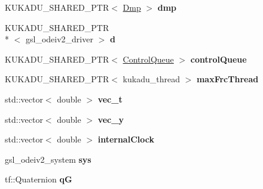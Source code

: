 \begin{DoxyCompactItemize}
\item 
\hypertarget{classkukadu_1_1DMPExecutor_a86ae6f53f67b0bc48e3973f587bd1dc1}{K\-U\-K\-A\-D\-U\-\_\-\-S\-H\-A\-R\-E\-D\-\_\-\-P\-T\-R$<$ \hyperlink{classkukadu_1_1Dmp}{Dmp} $>$ {\bfseries dmp}}\label{classkukadu_1_1DMPExecutor_a86ae6f53f67b0bc48e3973f587bd1dc1}

\item 
\hypertarget{classkukadu_1_1DMPExecutor_a08fe6c0abe03d902f7899691c8010594}{K\-U\-K\-A\-D\-U\-\_\-\-S\-H\-A\-R\-E\-D\-\_\-\-P\-T\-R\\*
$<$ gsl\-\_\-odeiv2\-\_\-driver $>$ {\bfseries d}}\label{classkukadu_1_1DMPExecutor_a08fe6c0abe03d902f7899691c8010594}

\item 
\hypertarget{classkukadu_1_1DMPExecutor_abf8c7b74c313d23e33499816d5c0a371}{K\-U\-K\-A\-D\-U\-\_\-\-S\-H\-A\-R\-E\-D\-\_\-\-P\-T\-R$<$ \hyperlink{classkukadu_1_1ControlQueue}{Control\-Queue} $>$ {\bfseries control\-Queue}}\label{classkukadu_1_1DMPExecutor_abf8c7b74c313d23e33499816d5c0a371}

\item 
\hypertarget{classkukadu_1_1DMPExecutor_a076fb3450f41f77de451784689f33116}{K\-U\-K\-A\-D\-U\-\_\-\-S\-H\-A\-R\-E\-D\-\_\-\-P\-T\-R$<$ kukadu\-\_\-thread $>$ {\bfseries max\-Frc\-Thread}}\label{classkukadu_1_1DMPExecutor_a076fb3450f41f77de451784689f33116}

\item 
\hypertarget{classkukadu_1_1DMPExecutor_ab202defc67dd1ca63492dd35a53796bf}{std\-::vector$<$ double $>$ {\bfseries vec\-\_\-t}}\label{classkukadu_1_1DMPExecutor_ab202defc67dd1ca63492dd35a53796bf}

\item 
\hypertarget{classkukadu_1_1DMPExecutor_a254a09001b3b233b155657ef39c2f5ac}{std\-::vector$<$ double $>$ {\bfseries vec\-\_\-y}}\label{classkukadu_1_1DMPExecutor_a254a09001b3b233b155657ef39c2f5ac}

\item 
\hypertarget{classkukadu_1_1DMPExecutor_aed2068ec0e2086b7979a5f7efa9cb3d6}{std\-::vector$<$ double $>$ {\bfseries internal\-Clock}}\label{classkukadu_1_1DMPExecutor_aed2068ec0e2086b7979a5f7efa9cb3d6}

\item 
\hypertarget{classkukadu_1_1DMPExecutor_a073f76c053591ab8d1e9a845aae8cf18}{gsl\-\_\-odeiv2\-\_\-system {\bfseries sys}}\label{classkukadu_1_1DMPExecutor_a073f76c053591ab8d1e9a845aae8cf18}

\item 
\hypertarget{classkukadu_1_1DMPExecutor_a55dfbfd07fe7b5d85fccc5f0a2004d9c}{tf\-::\-Quaternion {\bfseries q\-G}}\label{classkukadu_1_1DMPExecutor_a55dfbfd07fe7b5d85fccc5f0a2004d9c}


\end{DoxyCompactItemize}
